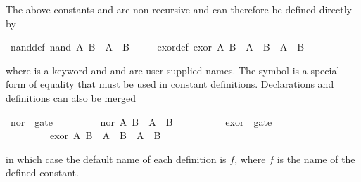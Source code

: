 \begin{isabellebody}
\begin{isamarkuptext}
The above constants  and  are non-recursive and can
therefore be defined directly by%
\end{isamarkuptext}%
\ nand{\isacharunderscore}def{\isacharcolon}\ {\isachardoublequote}nand\ A\ B\ {\isasymequiv}\ {\isasymnot}{\isacharparenleft}A\ {\isasymand}\ B{\isacharparenright}{\isachardoublequote}\isanewline
\ \ \ \ \ exor{\isacharunderscore}def{\isacharcolon}\ {\isachardoublequote}exor\ A\ B\ {\isasymequiv}\ A\ {\isasymand}\ {\isasymnot}B\ {\isasymor}\ {\isasymnot}A\ {\isasymand}\ B{\isachardoublequote}%
\begin{isamarkuptext}%
\noindent%
where  is a keyword and
 and  are user-supplied names.
The symbol  is a special form of equality
that must be used in constant definitions.
Declarations and definitions can also be merged%
\end{isamarkuptext}%
\ nor\ {\isacharcolon}{\isacharcolon}\ gate\isanewline
\ \ \ \ \ \ \ \ \ {\isachardoublequote}nor\ A\ B\ {\isasymequiv}\ {\isasymnot}{\isacharparenleft}A\ {\isasymor}\ B{\isacharparenright}{\isachardoublequote}\isanewline
\ \ \ \ \ \ \ \ \ \ exor\ {\isacharcolon}{\isacharcolon}\ gate\isanewline
\ \ \ \ \ \ \ \ \ {\isachardoublequote}exor\ A\ B\ {\isasymequiv}\ {\isacharparenleft}A\ {\isasymor}\ B{\isacharparenright}\ {\isasymand}\ {\isacharparenleft}{\isasymnot}A\ {\isasymor}\ {\isasymnot}B{\isacharparenright}{\isachardoublequote}%
\begin{isamarkuptext}%
\noindent{}%
in which case the default name of each definition is $f$, where
$f$ is the name of the defined constant.%
\end{isamarkuptext}%
\end{isabellebody}%
